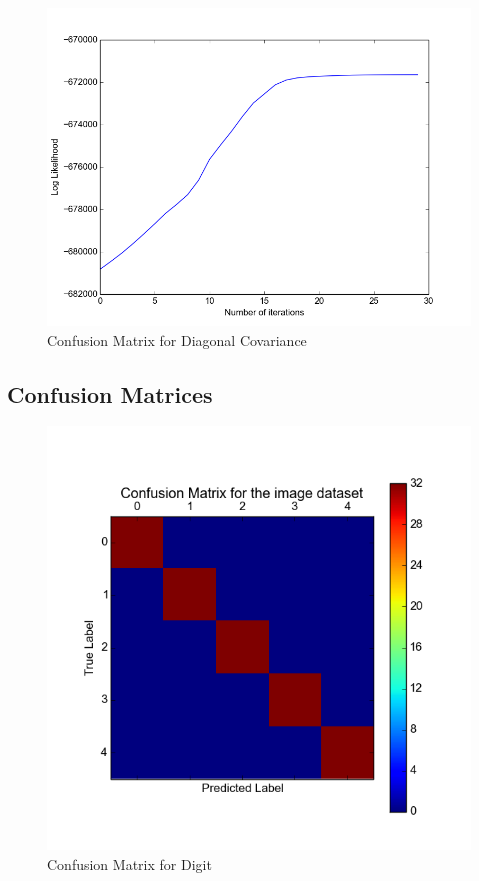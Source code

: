 \documentclass[11pt,a4paper]{article}
\begin{document}
\begin{minipage}[b]{0.5\textwidth}
\begin{figure}[H]
  \centering
  \includegraphics[width=.8\linewidth]{Figures/likelihood_digits4.png}
\caption{Confusion Matrix for Diagonal Covariance}
  \label{fig:sfig1}
\end{figure}%
\end{minipage}

\subsection{Confusion Matrices}

\begin{minipage}[b]{0.5\textwidth}
\begin{figure}[H]
  \centering
  \includegraphics[width=.8\linewidth]{Figures/confusion_digit.png}
  \caption{Confusion Matrix for Digit}
  \label{fig:sfig1}
\end{figure}%
\end{minipage}
\end{document}
